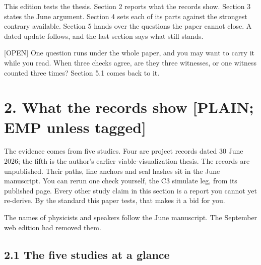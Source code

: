 \documentclass[11pt]{article}
\newcommand{\register}[1]{{\ttfamily\small #1}}
\begin{document}
This edition tests the thesis. Section 2 reports what the records show. Section 3 states the June argument. Section 4 sets each of its parts against the strongest contrary available. Section 5 hands over the questions the paper cannot close. A dated update follows, and the last section says what still stands.

\register{[OPEN]} One question runs under the whole paper, and you may want to carry it while you read. When three checks agree, are they three witnesses, or one witness counted three times? Section 5.1 comes back to it.

\section*{2. What the records show \register{[PLAIN; EMP unless tagged]}}

The evidence comes from five studies. Four are project records dated 30 June 2026; the fifth is the author's earlier viable-visualization thesis. The records are unpublished. Their paths, line anchors and seal hashes sit in the June manuscript. You can rerun one check yourself, the C3 simulate leg, from its published page. Every other study claim in this section is a report you cannot yet re-derive. By the standard this paper tests, that makes it a bid for you.

The names of physicists and speakers follow the June manuscript. The September web edition had removed them.

\subsection*{2.1 The five studies at a glance}
\end{document}
